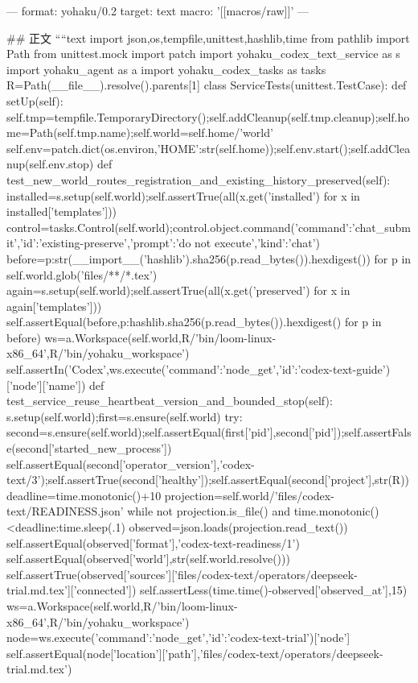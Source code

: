 ---
format: yohaku/0.2
target: text
macro: '[[macros/raw]]'
---

## 正文
````text
import json,os,tempfile,unittest,hashlib,time
from pathlib import Path
from unittest.mock import patch
import yohaku_codex_text_service as s
import yohaku_agent as a
import yohaku_codex_tasks as tasks
R=Path(__file__).resolve().parents[1]
class ServiceTests(unittest.TestCase):
 def setUp(self):
  self.tmp=tempfile.TemporaryDirectory();self.addCleanup(self.tmp.cleanup);self.home=Path(self.tmp.name);self.world=self.home/'world'
  self.env=patch.dict(os.environ,{'HOME':str(self.home)});self.env.start();self.addCleanup(self.env.stop)
 def test_new_world_routes_registration_and_existing_history_preserved(self):
  installed=s.setup(self.world);self.assertTrue(all(x.get('installed') for x in installed['templates']))
  control=tasks.Control(self.world);control.object.command({'command':'chat_submit','id':'existing-preserve','prompt':'do not execute','kind':'chat'})
  before={p:str(__import__('hashlib').sha256(p.read_bytes()).hexdigest()) for p in self.world.glob('files/**/*.tex')}
  again=s.setup(self.world);self.assertTrue(all(x.get('preserved') for x in again['templates']))
  self.assertEqual(before,{p:hashlib.sha256(p.read_bytes()).hexdigest() for p in before})
  ws=a.Workspace(self.world,R/'bin/loom-linux-x86_64',R/'bin/yohaku_workspace')
  self.assertIn('Codex',ws.execute({'command':'node_get','id':'codex-text-guide'})['node']['name'])
 def test_service_reuse_heartbeat_version_and_bounded_stop(self):
  s.setup(self.world);first=s.ensure(self.world)
  try:
   second=s.ensure(self.world);self.assertEqual(first['pid'],second['pid']);self.assertFalse(second['started_new_process'])
   self.assertEqual(second['operator_version'],'codex-text/3');self.assertTrue(second['healthy']);self.assertEqual(second['project'],str(R))
   deadline=time.monotonic()+10
   projection=self.world/'files/codex-text/READINESS.json'
   while not projection.is_file() and time.monotonic()<deadline:time.sleep(.1)
   observed=json.loads(projection.read_text())
   self.assertEqual(observed['format'],'codex-text-readiness/1')
   self.assertEqual(observed['world'],str(self.world.resolve()))
   self.assertTrue(observed['sources']['files/codex-text/operators/deepseek-trial.md.tex']['connected'])
   self.assertLess(time.time()-observed['observed_at'],15)
   ws=a.Workspace(self.world,R/'bin/loom-linux-x86_64',R/'bin/yohaku_workspace')
   node=ws.execute({'command':'node_get','id':'codex-text-trial'})['node']
   self.assertEqual(node['location']['path'],'files/codex-text/operators/deepseek-trial.md.tex')
